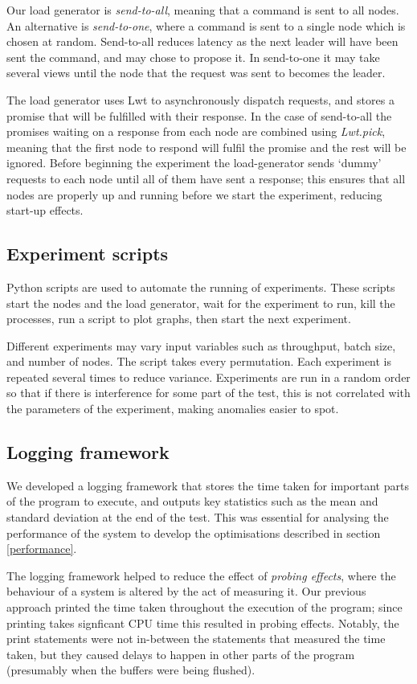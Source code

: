 Our load generator is \textit{send-to-all}, meaning that a command is sent to all nodes. An alternative is \textit{send-to-one}, where a command is sent to a single node which is chosen at random. Send-to-all reduces latency as the next leader will have been sent the command, and may chose to propose it. In send-to-one it may take several views until the node that the request was sent to becomes the leader.

The load generator uses Lwt to asynchronously dispatch requests, and stores a promise that will be fulfilled with their response. In the case of send-to-all the promises waiting on a response from each node are combined using \textit{Lwt.pick}, meaning that the first node to respond will fulfil the promise and the rest will be ignored. Before beginning the experiment the load-generator sends `dummy' requests to each node until all of them have sent a response; this ensures that all nodes are properly up and running before we start the experiment, reducing start-up effects.

\subsection{Experiment scripts} \label{experimentscripts}
Python scripts are used to automate the running of experiments. These scripts start the nodes and the load generator, wait for the experiment to run, kill the processes, run a script to plot graphs, then start the next experiment.

Different experiments may vary input variables such as throughput, batch size, and number of nodes. The script takes every permutation. Each experiment is repeated several times to reduce variance. Experiments are run in a random order so that if there is interference for some part of the test, this is not correlated with the parameters of the experiment, making anomalies easier to spot.

\subsection{Logging framework}
We developed a logging framework that stores the time taken for important parts of the program to execute, and outputs key statistics such as the mean and standard deviation at the end of the test. This was essential for analysing the performance of the system to develop the optimisations described in section \ref{performance}.

The logging framework helped to reduce the effect of \textit{probing effects}, where the behaviour of a system is altered by the act of measuring it. Our previous approach printed the time taken throughout the execution of the program; since printing takes signficant CPU time this resulted in probing effects. Notably, the print statements were not in-between the statements that measured the time taken, but they caused delays to happen in other parts of the program (presumably when the buffers were being flushed).

